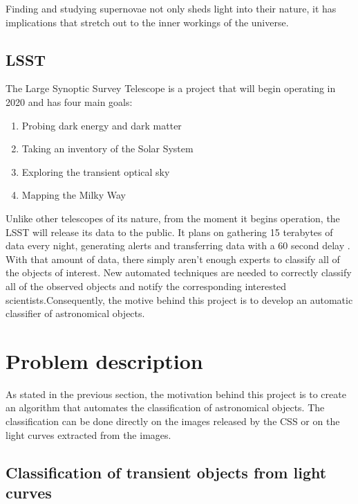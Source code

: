 Finding and studying supernovae not only sheds light into their nature, it has implications that stretch out to the inner workings of the universe.

\subsection{LSST}

The Large Synoptic Survey Telescope is a project that will begin operating in 2020 and has four main goals\cite{LSST}: 

\begin{enumerate}
  \item Probing dark energy and dark matter
  \item Taking an inventory of the Solar System
  \item Exploring the transient optical sky
  \item Mapping the Milky Way
\end{enumerate}

Unlike other telescopes of its nature, from the moment it begins operation, the LSST will release its data to the public. It plans on gathering 15 terabytes of data every night, generating alerts and transferring data with a 60 second delay \cite{LSST}.\\

With that amount of data, there simply aren't enough experts to classify all of the objects of interest. New automated techniques are needed to correctly classify all of the observed objects and notify the corresponding interested scientists.Consequently, the motive behind this project is to develop an automatic classifier of astronomical objects. \\

\section{Problem description}

As stated in the previous section, the motivation behind this project is to create an algorithm that automates the classification of astronomical objects. The classification can be done directly on the images released by the CSS \cite{catalina} or on the light curves extracted from the images. 


\subsection{Classification of transient objects from light curves}

